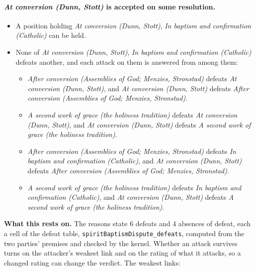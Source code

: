 \documentclass[11pt]{article}
\begin{document}
\paragraph{\emph{At conversion (Dunn, Stott)} is accepted on some resolution.}
\begin{itemize}
\item A position holding \emph{At conversion (Dunn, Stott)}, \emph{In baptism and confirmation (Catholic)} can be held.
\item None of \emph{At conversion (Dunn, Stott)}, \emph{In baptism and confirmation (Catholic)} defeats another, and each attack on them is answered from among them:
\begin{itemize}
\item \emph{After conversion (Assemblies of God; Menzies, Stronstad)} defeats \emph{At conversion (Dunn, Stott)}, and \emph{At conversion (Dunn, Stott)} defeats \emph{After conversion (Assemblies of God; Menzies, Stronstad)}.
\item \emph{A second work of grace (the holiness tradition)} defeats \emph{At conversion (Dunn, Stott)}, and \emph{At conversion (Dunn, Stott)} defeats \emph{A second work of grace (the holiness tradition)}.
\item \emph{After conversion (Assemblies of God; Menzies, Stronstad)} defeats \emph{In baptism and confirmation (Catholic)}, and \emph{At conversion (Dunn, Stott)} defeats \emph{After conversion (Assemblies of God; Menzies, Stronstad)}.
\item \emph{A second work of grace (the holiness tradition)} defeats \emph{In baptism and confirmation (Catholic)}, and \emph{At conversion (Dunn, Stott)} defeats \emph{A second work of grace (the holiness tradition)}.
\end{itemize}
\end{itemize}
\par\noindent\textbf{What this rests on.} The reasons state 6 defeats and 4 absences of defeat, each a cell of the defeat table, \texttt{spirit\allowbreak{}Baptism\allowbreak{}Dispute\_\allowbreak{}defeats}, computed from the two parties' premises and checked by the kernel. Whether an attack survives turns on the attacker's weakest link and on the rating of what it attacks, so a changed rating can change the verdict. The weakest links:
\end{document}
